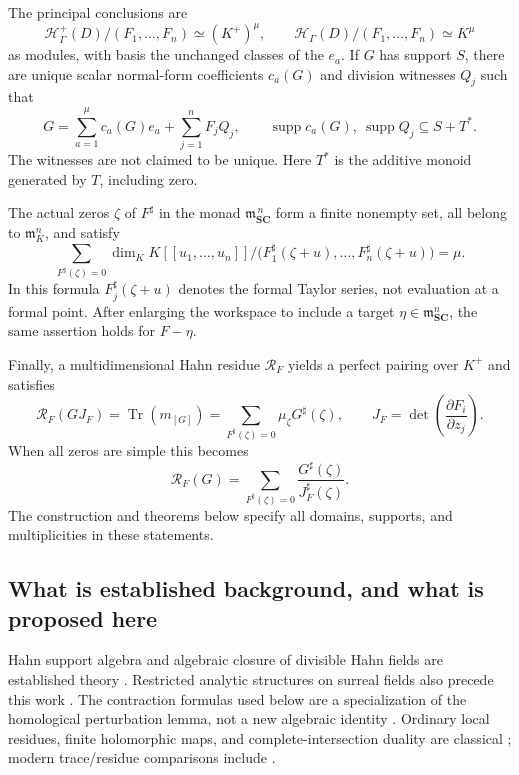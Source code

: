 \documentclass[11pt,letterpaper]{article}
\theoremstyle{definition}
\theoremstyle{remark}
\newcommand{\SC}{\mathbf{SC}}
\newcommand{\HH}{\mathcal H}
\newcommand{\mm}{\mathfrak m}
\newcommand{\supp}{\operatorname{supp}}
\newcommand{\Tr}{\operatorname{Tr}}
\newcommand{\sh}{^{\sharp}}
\newcommand{\Kp}{K^{+}}
\newcommand{\Hp}{\HH^{+}_{\Gamma}}
\newcommand{\Hh}{\HH_{\Gamma}}
\newcommand{\RR}{\mathcal R}
\begin{document}
The principal conclusions are
\begin{equation}\label{eq:introfree}
 \Hp(D)/(F_1,\ldots,F_n)\simeq (\Kp)^\mu,
 \qquad
 \Hh(D)/(F_1,\ldots,F_n)\simeq K^\mu
\end{equation}
as modules, with basis the unchanged classes of the $e_a$. If $G$ has support $S$, there are unique scalar normal-form coefficients $c_a(G)$ and division witnesses $Q_j$ such that
\begin{equation}\label{eq:introdivision}
 G=\sum_{a=1}^{\mu}c_a(G)e_a+\sum_{j=1}^{n}F_jQ_j,
 \qquad
 \supp c_a(G),\ \supp Q_j\subseteq S+T^*.
\end{equation}
The witnesses are not claimed to be unique. Here $T^*$ is the additive monoid generated by $T$, including zero.

The actual zeros $\zeta$ of $F\sh$ in the monad $\mm_{\SC}^{\,n}$ form a finite nonempty set, all belong to $\mm_K^n$, and satisfy
\begin{equation}\label{eq:introlength}
 \sum_{F\sh(\zeta)=0}
 \dim_K K[[u_1,\ldots,u_n]]/
       \bigl(F_1\sh(\zeta+u),\ldots,F_n\sh(\zeta+u)\bigr)=\mu.
\end{equation}
In this formula $F_j\sh(\zeta+u)$ denotes the formal Taylor series, not evaluation at a formal point. After enlarging the workspace to include a target $\eta\in\mm_{\SC}^n$, the same assertion holds for $F-\eta$.

Finally, a multidimensional Hahn residue $\RR_F$ yields a perfect pairing over $\Kp$ and satisfies
\begin{equation}\label{eq:introtrace}
 \RR_F(GJ_F)=\Tr(m_{[G]})
       =\sum_{F\sh(\zeta)=0}\mu_\zeta G\sh(\zeta),
 \qquad J_F=\det\left(\frac{\partial F_i}{\partial z_j}\right).
\end{equation}
When all zeros are simple this becomes
\[
 \RR_F(G)=\sum_{F\sh(\zeta)=0}
          \frac{G\sh(\zeta)}{J_F\sh(\zeta)}.
\]
The construction and theorems below specify all domains, supports, and multiplicities in these statements.

\subsection{What is established background, and what is proposed here}
Hahn support algebra and algebraic closure of divisible Hahn fields are established theory \cite{Poonen}. Restricted analytic structures on surreal fields also precede this work \cite{vdDE}. The contraction formulas used below are a specialization of the homological perturbation lemma, not a new algebraic identity \cite{Crainic}. Ordinary local residues, finite holomorphic maps, and complete-intersection duality are classical \cite{Cartan,GunningRossi,GriffithsHarris,Hartshorne,Kunz}; modern trace/residue comparisons include \cite{NayakSastry}.
\end{document}
